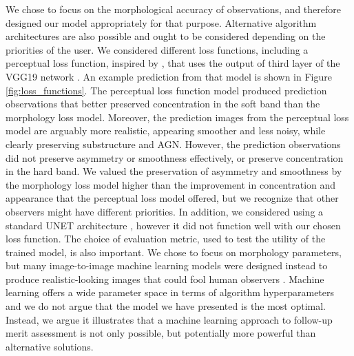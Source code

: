 We chose to focus on the morphological accuracy of observations, and therefore designed our model appropriately for that purpose. Alternative algorithm architectures are also possible and ought to be considered depending on the priorities of the user. We considered different loss functions, including a perceptual loss function, inspired by \cite{ploss}, that uses the output of third layer of the VGG19 network \cite{VGG19}. An example prediction from that model is shown in Figure \ref{fig:loss_functions}. The perceptual loss function model produced prediction observations that better preserved concentration in the soft band than the morphology loss model. Moreover, the prediction images from the perceptual loss model are arguably more realistic, appearing smoother and less noisy, while clearly preserving substructure and AGN. However, the prediction observations did not preserve asymmetry or smoothness effectively, or preserve concentration in the hard band. We valued the preservation of asymmetry and smoothness by the morphology loss model higher than the improvement in concentration and appearance that the perceptual loss model offered, but we recognize that other observers might have different priorities. In addition, we considered using a standard UNET architecture \cite{UNET}, however it did not function well with our chosen loss function. The choice of evaluation metric, used to test the utility of the trained model, is also important. We chose to focus on morphology parameters, but many image-to-image machine learning models were designed instead to produce realistic-looking images that could fool human observers \cite[see][for examples of different image accuracy metrics, including human evaluation]{Dahl_2017}. Machine learning offers a wide parameter space in terms of algorithm hyperparameters and we do not argue that the model we have presented is the most optimal. Instead, we argue it illustrates that a machine learning approach to follow-up merit assessment is not only possible, but potentially more powerful than alternative solutions.

